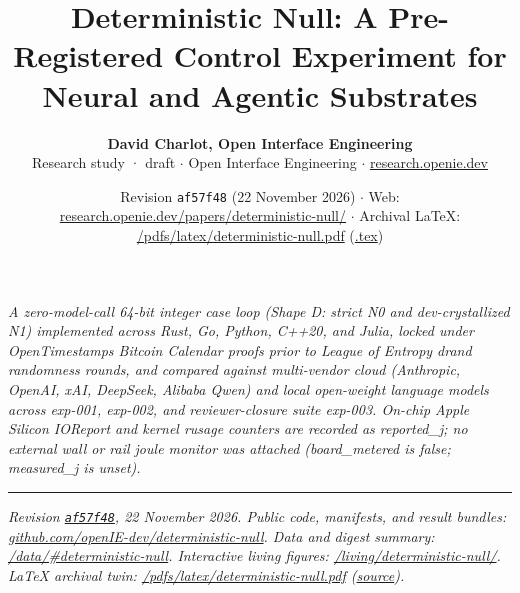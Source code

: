 \documentclass[10pt,letterpaper]{article}
\title{\vspace{-1.2em}\textbf{Deterministic Null: A Pre-Registered Control Experiment for Neural and Agentic Substrates}}
\author{\textbf{David Charlot, Open Interface Engineering}\\[0.15em]
{\small Research study · draft $\cdot$ Open Interface Engineering $\cdot$ \href{https://research.openie.dev}{research.openie.dev}}}
\date{\small Revision \texttt{af57f48} (22 November 2026) $\cdot$ Web: \href{https://research.openie.dev/papers/deterministic-null/}{research.openie.dev/papers/deterministic-null/} $\cdot$ Archival LaTeX: \href{https://research.openie.dev/pdfs/latex/deterministic-null.pdf}{/pdfs/latex/deterministic-null.pdf} (\href{https://research.openie.dev/pdfs/latex/deterministic-null.tex}{.tex})}
\begin{document}
\maketitle
\vspace{-0.6em}

\noindent{}

\vspace{6pt}
\hspace{8pt}%
\parbox{\dimexpr\linewidth-11pt\relax}{%
  \small\itshape\color{openieSlate}%
  A zero-model-call 64-bit integer case loop (Shape D: strict N0 and dev-crystallized N1) implemented across Rust, Go, Python, C++20, and Julia, locked under OpenTimestamps Bitcoin Calendar proofs prior to League of Entropy drand randomness rounds, and compared against multi-vendor cloud (Anthropic, OpenAI, xAI, DeepSeek, Alibaba Qwen) and local open-weight language models across exp-001, exp-002, and reviewer-closure suite exp-003. On-chip Apple Silicon IOReport and kernel rusage counters are recorded as reported\_j; no external wall or rail joule monitor was attached (board\_metered is false; measured\_j is unset).
}
\vspace{6pt}

{
\small
\setcounter{tocdepth}{2}
\tableofcontents
}
\vspace{4pt}
\hrule
\vspace{8pt}

\emph{Revision
\href{https://github.com/openIE-dev/research-openie-web/commits/main/src/content/papers/deterministic-null.md}{\texttt{af57f48}},
22 November 2026. Public code, manifests, and result bundles:
\href{https://github.com/openIE-dev/deterministic-null}{github.com/openIE-dev/deterministic-null}.
Data and digest summary:
\href{https://research.openie.dev/data/\#deterministic-null}{/data/\#deterministic-null}.
Interactive living figures:
\href{https://research.openie.dev/living/deterministic-null/}{/living/deterministic-null/}.
LaTeX archival twin:
\href{https://research.openie.dev/pdfs/latex/deterministic-null.pdf}{/pdfs/latex/deterministic-null.pdf}
(\href{https://research.openie.dev/pdfs/latex/deterministic-null.tex}{source}).}
\end{document}
